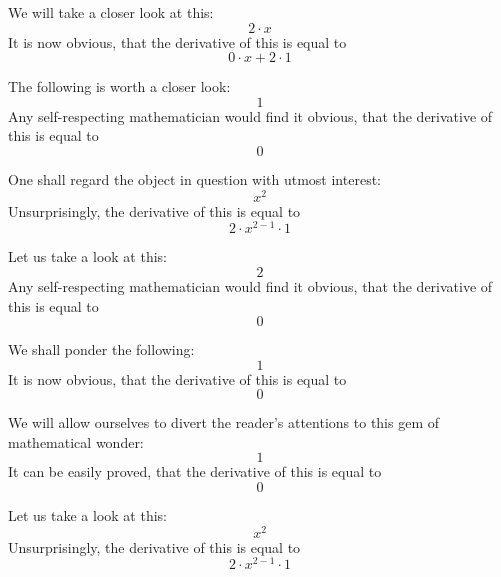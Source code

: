 \documentclass{article}
\begin{document}
We will take a closer look at this:
\begin{equation}
2 \cdot x 
\end{equation}
It is now obvious, that the derivative of this is equal to
\begin{equation}
0 \cdot x + 2 \cdot 1 
\end{equation}

The following is worth a closer look:
\begin{equation}
1 
\end{equation}
Any self-respecting mathematician would find it obvious, that the derivative of this is equal to
\begin{equation}
0 
\end{equation}

One shall regard the object in question with utmost interest:
\begin{equation}
x ^{2 } 
\end{equation}
Unsurprisingly, the derivative of this is equal to
\begin{equation}
2 \cdot x ^{2 - 1 } \cdot 1 
\end{equation}

Let us take a look at this:
\begin{equation}
2 
\end{equation}
Any self-respecting mathematician would find it obvious, that the derivative of this is equal to
\begin{equation}
0 
\end{equation}

We shall ponder the following:
\begin{equation}
1 
\end{equation}
It is now obvious, that the derivative of this is equal to
\begin{equation}
0 
\end{equation}

We will allow ourselves to divert the reader's attentions to this gem of mathematical wonder:
\begin{equation}
1 
\end{equation}
It can be easily proved, that the derivative of this is equal to
\begin{equation}
0 
\end{equation}

Let us take a look at this:
\begin{equation}
x ^{2 } 
\end{equation}
Unsurprisingly, the derivative of this is equal to
\begin{equation}
2 \cdot x ^{2 - 1 } \cdot 1 
\end{equation}
\end{document}
